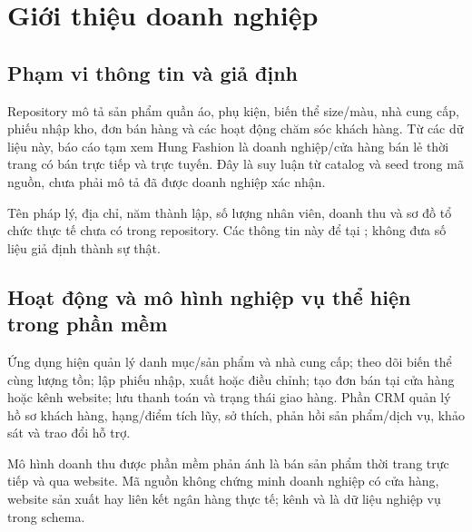 \chapter{Giới thiệu doanh nghiệp}
\section{Phạm vi thông tin và giả định}
Repository mô tả sản phẩm quần áo, phụ kiện, biến thể size/màu, nhà cung cấp, phiếu nhập kho, đơn bán hàng và các hoạt động chăm sóc khách hàng. Từ các dữ liệu này, báo cáo tạm xem Hung Fashion là doanh nghiệp/cửa hàng bán lẻ thời trang có bán trực tiếp và trực tuyến. Đây là suy luận từ catalog và seed trong mã nguồn, chưa phải mô tả đã được doanh nghiệp xác nhận.

Tên pháp lý, địa chỉ, năm thành lập, số lượng nhân viên, doanh thu và sơ đồ tổ chức thực tế chưa có trong repository. Các thông tin này để tại \texttt{}; không đưa số liệu giả định thành sự thật.

\section{Hoạt động và mô hình nghiệp vụ thể hiện trong phần mềm}
Ứng dụng hiện quản lý danh mục/sản phẩm và nhà cung cấp; theo dõi biến thể cùng lượng tồn; lập phiếu nhập, xuất hoặc điều chỉnh; tạo đơn bán tại cửa hàng hoặc kênh website; lưu thanh toán và trạng thái giao hàng. Phần CRM quản lý hồ sơ khách hàng, hạng/điểm tích lũy, sở thích, phản hồi sản phẩm/dịch vụ, khảo sát và trao đổi hỗ trợ.

Mô hình doanh thu được phần mềm phản ánh là bán sản phẩm thời trang trực tiếp và qua website. Mã nguồn không chứng minh doanh nghiệp có cửa hàng, website sản xuất hay liên kết ngân hàng thực tế; kênh \texttt{} và \texttt{} là dữ liệu nghiệp vụ trong schema.

